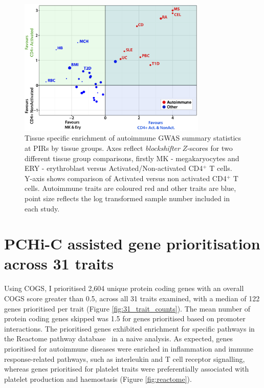\documentclass[a4paper,11pt]{report}
\begin{document}
\begin{figure}[h]
\centering
\includegraphics[width=0.8\textwidth]{tcell_blockshifter_scatter.pdf}
\caption{Tissue specific enrichment of autoimmune GWAS summary statistics at PIRs by tissue groups. Axes reflect \textit{blockshifter} $Z$-scores for two different tissue group comparisons, firstly MK - megakaryocytes and ERY - erythroblast versus Activated/Non-activated CD4$^{+}$ T cells. Y-axis shows comparison of Activated versus non activated CD4$^{+}$ T cells. Autoimmune traits are coloured red and other traits are blue, point size reflects the log transformed sample number included in each study.}
\label{fig:bs_2}
\end{figure}

\section{PCHi-C assisted gene prioritisation across 31 traits}
\label{sect:tp_reactome}
Using COGS, I prioritised 2,604  unique protein coding genes with an overall COGS score greater than 0.5, across all 31 traits examined, with a median of 122 genes prioritised per trait (Figure \ref{fig:31_trait_counts}). The mean number of protein coding genes skipped was 1.5 for genes prioritised based on promoter interactions. The prioritised genes exhibited enrichment for specific pathways in the Reactome pathway database~\citep{FabregatSidiropoulosGarapatiEtAl2016} in a naive analysis. As expected, genes prioritised for autoimmune diseases were enriched in inflammation and immune response-related pathways, such as interleukin and T cell receptor signalling, whereas genes prioritised for platelet traits were preferentially associated with platelet production and haemostasis (Figure \ref{fig:reactome}). 
\end{document}
